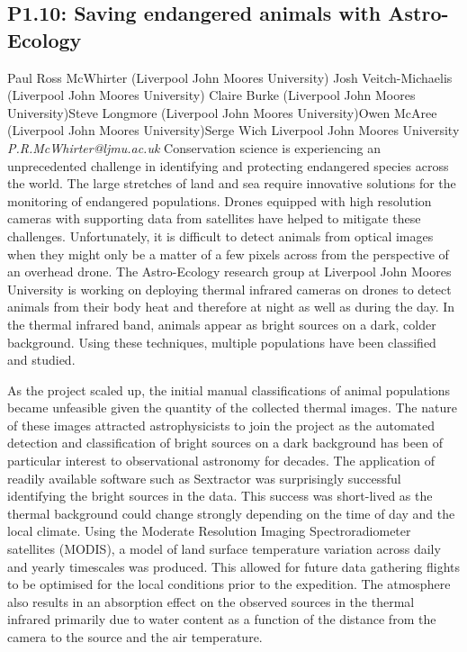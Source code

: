 \documentclass{report}
\begin{document}
\subsection*{P1.10: Saving endangered animals with Astro-Ecology}
\bigskip
Paul Ross McWhirter (Liverpool John Moores University) \newline Josh Veitch-Michaelis (Liverpool John Moores University) \newline  Claire Burke (Liverpool John Moores University)\newline  Steve Longmore (Liverpool John Moores University)\newline Owen McAree (Liverpool John Moores University)\newline  Serge Wich
Liverpool John Moores University\newline\newline
{\it P.R.McWhirter@ljmu.ac.uk}\newline
\newline\newline
Conservation science is experiencing an unprecedented challenge in identifying and protecting endangered species across the world. The large stretches of land and sea require innovative solutions for the monitoring of endangered populations. Drones equipped with high resolution cameras with supporting data from satellites have helped to mitigate these challenges. Unfortunately, it is difficult to detect animals from optical images when they might only be a matter of a few pixels across from the perspective of an overhead drone. The Astro-Ecology research group at Liverpool John Moores University is working on deploying thermal infrared cameras on drones to detect animals from their body heat and therefore at night as well as during the day. In the thermal infrared band, animals appear as bright sources on a dark, colder background. Using these techniques, multiple populations have been classified and studied.

As the project scaled up, the initial manual classifications of animal populations became unfeasible given the quantity of the collected thermal images. The nature of these images attracted astrophysicists to join the project as the automated detection and classification of bright sources on a dark background has been of particular interest to observational astronomy for decades. The application of readily available software such as Sextractor was surprisingly successful identifying the bright sources in the data. This success was short-lived as the thermal background could change strongly depending on the time of day and the local climate. Using the Moderate Resolution Imaging Spectroradiometer satellites (MODIS), a model of land surface temperature variation across daily and yearly timescales was produced. This allowed for future data gathering flights to be optimised for the local conditions prior to the expedition. The atmosphere also results in an absorption effect on the observed sources in the thermal infrared primarily due to water content as a function of the distance from the camera to the source and the air temperature.
\end{document}
